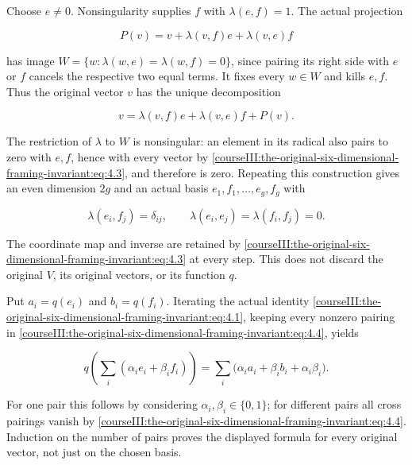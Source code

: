 Choose \(e\ne0\). Nonsingularity supplies \(f\) with \(\lambda(e,f)=1\). The actual projection

\begin{equation}
P(v)=v+\lambda(v,f)e+\lambda(v,e)f
 \label{courseIII:the-original-six-dimensional-framing-invariant:eq:4.2}
\end{equation}

has image \(W=\{w:\lambda(w,e)=\lambda(w,f)=0\}\), since pairing its right side with \(e\) or \(f\) cancels the respective two equal terms. It fixes every \(w\in W\) and kills \(e,f\). Thus the original vector \(v\) has the unique decomposition

\begin{equation}
v=\lambda(v,f)e+\lambda(v,e)f+P(v).
 \label{courseIII:the-original-six-dimensional-framing-invariant:eq:4.3}
\end{equation}

The restriction of \(\lambda\) to \(W\) is nonsingular: an element in its radical also pairs to zero with \(e,f\), hence with every vector by \eqref{courseIII:the-original-six-dimensional-framing-invariant:eq:4.3}, and therefore is zero. Repeating this construction gives an even dimension \(2g\) and an actual basis \(e_1,f_1,\ldots,e_g,f_g\) with

\begin{equation}
\lambda(e_i,f_j)=\delta_{ij},\qquad
 \lambda(e_i,e_j)=\lambda(f_i,f_j)=0.
 \label{courseIII:the-original-six-dimensional-framing-invariant:eq:4.4}
\end{equation}

The coordinate map and inverse are retained by \eqref{courseIII:the-original-six-dimensional-framing-invariant:eq:4.3} at every step. This does not discard the original \(V\), its original vectors, or its function \(q\).

Put \(a_i=q(e_i)\) and \(b_i=q(f_i)\). Iterating the actual identity \eqref{courseIII:the-original-six-dimensional-framing-invariant:eq:4.1}, keeping every nonzero pairing in \eqref{courseIII:the-original-six-dimensional-framing-invariant:eq:4.4}, yields

\begin{equation}
q\!\left(\sum_i(\alpha_i e_i+\beta_i f_i)\right)
  =\sum_i\bigl(\alpha_i a_i+\beta_i b_i+\alpha_i\beta_i\bigr).
 \label{courseIII:the-original-six-dimensional-framing-invariant:eq:4.5}
\end{equation}

For one pair this follows by considering \(\alpha_i,\beta_i\in\{0,1\}\); for different pairs all cross pairings vanish by \eqref{courseIII:the-original-six-dimensional-framing-invariant:eq:4.4}. Induction on the number of pairs proves the displayed formula for every original vector, not just on the chosen basis.

